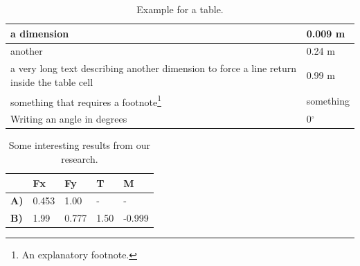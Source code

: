 \documentclass[letterpaper,times]{sae}
\begin{document}
\begin{table}[!htb]
\fontsize{8}{10}\selectfont
   \centering
   \caption{Example for a table.}\label{tab:sampleTable} 
   \begin{minipage}{\columnwidth}
\begin{tabular}{ |  L{0.8\arrayrulewidth} |  L{0.2\arrayrulewidth} | }
    \hline
a dimension & 0.009 m \\  \hline
another  & 0.24 m \\  \hline
a very long text describing another dimension to force a line return inside the table cell & 0.99 m \\  \hline
something that requires a footnote\footnote{An explanatory footnote.} & something \\  \hline
Writing an angle in degrees & 0$^{\circ}$ \\  \hline
  \end{tabular}\par
  \vspace{-0.15\skip\footins}
   \renewcommand{\footnoterule}{}
   \end{minipage}
\end{table}


\begin{table}[!htb]
\fontsize{8}{10}\selectfont
\centering
\caption{Some interesting results from our research.}\label{tab:sampleTable2}
\begin{tabular}{| L{0.1\arrayrulewidth} | L{0.225\arrayrulewidth} | L{0.225\arrayrulewidth} | L{0.225\arrayrulewidth} | L{0.225\arrayrulewidth} |}
\hline
            & \textbf{Fx}         & \textbf{Fy}         & \textbf{T}          & \textbf{M}            \\ \hline
\textbf{A)}    & 0.453      & 1.00       & -       & -         \\  \hline
\textbf{B)} & 1.99       & 0.777      & 1.50       & -0.999       \\  \hline
	\end{tabular}
	\par
   \vspace{-0.15\skip\footins}
   \renewcommand{\footnoterule}{}
\end{table}
\end{document}

